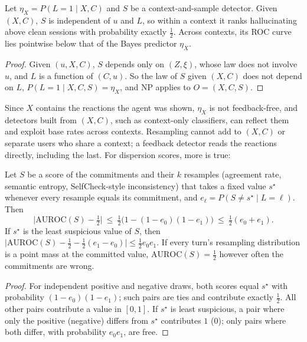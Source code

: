 \begin{theorem}
\label{thm:bound}
Let $\eta_X=P(L=1\mid X,C)$ and $S$ be a context-and-sample
detector. Given $(X,C)$, $S$ is independent of $u$ and $L$, so within a
context it ranks hallucinating above clean sessions with probability exactly
$\tfrac12$. Across contexts, its ROC curve lies
pointwise below that of the Bayes predictor $\eta_X$.
\end{theorem}
\begin{proof}
Given $(u,X,C)$, $S$ depends only on $(Z,\xi)$, whose law does not involve
$u$, and $L$ is a function of $(C,u)$. So the law of $S$ given $(X,C)$ does
not depend on $L$, $P(L=1\mid X,C,S)=\eta_X$, and NP applies to
$O=(X,C,S)$.
\end{proof}

\noindent Since $X$ contains the reactions the agent was shown,
$\eta_X$ is not feedback-free, and detectors built from $(X,C)$,
such as context-only classifiers, can reflect them and exploit base rates
across contexts. Resampling cannot add to $(X,C)$ or separate users who share
a context; a feedback detector reads the reactions directly, including the
last. For dispersion scores, more is true:

\begin{corollary}
\label{cor:degenerate}
Let $S$ be a score of the commitments and their $k$ resamples (agreement
rate, semantic entropy, SelfCheck-style inconsistency) that takes a fixed
value $s^\star$ whenever every resample equals its commitment, and
$e_\ell=P(S\neq s^\star\mid L=\ell)$. Then
\[
\big|\mathrm{AUROC}(S)-\tfrac12\big|\ \le\ \tfrac12\big(1-(1-e_0)(1-e_1)\big)
\ \le\ \tfrac12(e_0+e_1).
\]
If $s^\star$ is the least suspicious value of $S$, then
$\big|\mathrm{AUROC}(S)-\tfrac12-\tfrac12(e_1-e_0)\big|\le\tfrac12e_0e_1$. If
every turn's resampling distribution is a point mass at the committed value,
$\mathrm{AUROC}(S)=\tfrac12$ however often the commitments are wrong.
\end{corollary}
\begin{proof}
For independent positive and negative draws, both scores equal $s^\star$
with probability $(1-e_0)(1-e_1)$; such pairs are ties and contribute
exactly $\tfrac12$. All other pairs contribute a value in $[0,1]$. If
$s^\star$ is least suspicious, a pair where only the positive (negative)
differs from $s^\star$ contributes $1$ ($0$); only pairs where both differ,
with probability $e_0e_1$, are free.
\end{proof}


